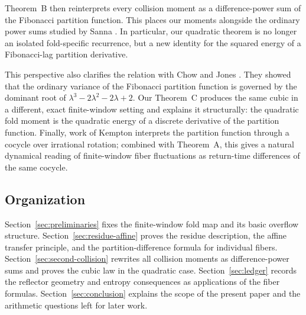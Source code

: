 Theorem~B then reinterprets every collision moment as a difference-power sum of
the Fibonacci partition function.  This places our moments alongside the
ordinary power sums studied by Sanna \cite{Sanna2025}.  In particular, our
quadratic theorem is no longer an isolated fold-specific recurrence, but a new
identity for the squared energy of a Fibonacci-lag partition derivative.

This perspective also clarifies the relation with Chow and Jones
\cite{ChowJones2024}.  They showed that the ordinary variance of the Fibonacci
partition function is governed by the dominant root of
\(\lambda^3-2\lambda^2-2\lambda+2\).  Our Theorem~C produces the same cubic in a
different, exact finite-window setting and explains it structurally: the
quadratic fold moment is the quadratic energy of a discrete derivative of the
partition function.  Finally, work of Kempton \cite{Kempton2023} interprets the
partition function through a cocycle over irrational rotation; combined with
Theorem~A, this gives a natural dynamical reading of finite-window fiber
fluctuations as return-time differences of the same cocycle.

\subsection{Organization}

Section~\ref{sec:preliminaries} fixes the finite-window fold map and its basic
overflow structure.  Section~\ref{sec:residue-affine} proves the residue
description, the affine transfer principle, and the partition-difference
formula for individual fibers.  Section~\ref{sec:second-collision} rewrites all
collision moments as difference-power sums and proves the cubic law in the
quadratic case.  Section~\ref{sec:ledger} records the reflector geometry and
entropy consequences as applications of the fiber formulas.
Section~\ref{sec:conclusion} explains the scope of the present paper and the
arithmetic questions left for later work.
